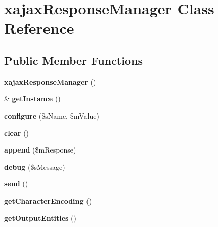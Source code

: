 \hypertarget{classxajaxResponseManager}{
\section{xajaxResponseManager Class Reference}
\label{classxajaxResponseManager}
}
\subsection*{Public Member Functions}
\begin{DoxyCompactItemize}
\item 
\hypertarget{classxajaxResponseManager_aa7d17461e8c19ee507166b80324ce59f}{
{\bfseries xajaxResponseManager} ()}
\label{classxajaxResponseManager_aa7d17461e8c19ee507166b80324ce59f}

\item 
\hypertarget{classxajaxResponseManager_af447b229f23ee4bd8cb68ddb9162eecf}{
\& {\bfseries getInstance} ()}
\label{classxajaxResponseManager_af447b229f23ee4bd8cb68ddb9162eecf}

\item 
\hypertarget{classxajaxResponseManager_ae2ce75f5a293394d004a843e95f2ad46}{
{\bfseries configure} (\$sName, \$mValue)}
\label{classxajaxResponseManager_ae2ce75f5a293394d004a843e95f2ad46}

\item 
\hypertarget{classxajaxResponseManager_abd22b9cdb24ad119fd1f83d2d2b82dbd}{
{\bfseries clear} ()}
\label{classxajaxResponseManager_abd22b9cdb24ad119fd1f83d2d2b82dbd}

\item 
\hypertarget{classxajaxResponseManager_a0cd84b0101b20fb77665465ebe2fa335}{
{\bfseries append} (\$mResponse)}
\label{classxajaxResponseManager_a0cd84b0101b20fb77665465ebe2fa335}

\item 
\hypertarget{classxajaxResponseManager_a62fb67ec215463b589e0197bb5fcf1c0}{
{\bfseries debug} (\$sMessage)}
\label{classxajaxResponseManager_a62fb67ec215463b589e0197bb5fcf1c0}

\item 
\hypertarget{classxajaxResponseManager_a5d6fab362371dabe1744604153232355}{
{\bfseries send} ()}
\label{classxajaxResponseManager_a5d6fab362371dabe1744604153232355}

\item 
\hypertarget{classxajaxResponseManager_a34b4caf7a47a57a6336128a1df3e2ad8}{
{\bfseries getCharacterEncoding} ()}
\label{classxajaxResponseManager_a34b4caf7a47a57a6336128a1df3e2ad8}

\item 
\hypertarget{classxajaxResponseManager_a8c6b50bb2181bca5bb71d093e4843519}{
{\bfseries getOutputEntities} ()}
\label{classxajaxResponseManager_a8c6b50bb2181bca5bb71d093e4843519}

\end{DoxyCompactItemize}
